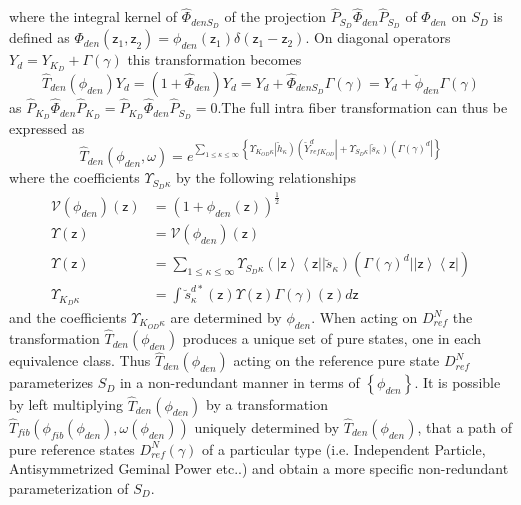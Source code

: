 \documentclass[aps,preprint]{revtex4}%
\begin{document}
where the integral kernel of $\hat{\Phi}_{denS_{D}}$ of the projection
$\hat{P}_{S_{D}}\hat{\Phi}_{den}\hat{P}_{S_{D}}$ of $\hat{\Phi}_{den}$ on
$S_{D}$ is defined as $\Phi_{den}\left(  \mathsf{z}_{1}\mathsf{,z}_{2}\right)
=\phi_{den}\left(  \mathsf{z}_{1}\right)  \delta\left(  \mathsf{z}%
_{1}-\mathsf{z}_{2}\right)  $. On diagonal operators $Y_{d}=Y_{K_{D}}%
+\Gamma\left(  \gamma\right)  $ this transformation becomes
\begin{equation}
\hat{T}_{den}\left(  \phi_{den}\right)  Y_{d}=\left(  1+\hat{\Phi}%
_{den}\right)  Y_{d}=Y_{d}+\hat{\Phi}_{denS_{D}}\Gamma\left(  \gamma\right)
=Y_{d}+\breve{\phi}_{den}\Gamma\left(  \gamma\right)
\end{equation}
as $\hat{P}_{K_{D}}\hat{\Phi}_{den}\hat{P}_{K_{D}}=\hat{P}_{K_{D}}\hat{\Phi
}_{den}\hat{P}_{S_{D}}=0.$The full intra fiber transformation can thus be
expressed as
\begin{equation}
\hat{T}_{den}\left(  \phi_{den},\omega\right)  =e^{\sum_{1\leq\kappa\leq
\infty}\left\{  \Upsilon_{K_{OD}\kappa}\left|  \breve{h}_{\kappa}\right)
\left(  \breve{Y}_{refK_{OD}}^{d}\right|  +\Upsilon_{S_{D}\kappa}\left|
\breve{s}_{\kappa}\right)  \left(  \Gamma\left(  \gamma\right)  ^{d}\right|
\right\}  } \label{refden}%
\end{equation}
where the coefficients $\Upsilon_{S_{D}\kappa}$ by the following relationships%
\begin{align}
\mathcal{V}\left(  \phi_{den}\right)  \left(  \mathsf{z}\right)   &  =\left(
1+\phi_{den}\left(  \mathsf{z}\right)  \right)  ^{\frac{1}{2}}\nonumber\\
\Upsilon\left(  \mathsf{z}\right)   &  =\mathcal{V}\left(  \phi_{den}\right)
\left(  \mathsf{z}\right) \nonumber\\
\Upsilon\left(  \mathsf{z}\right)   &  =\sum_{1\leq\kappa\leq\infty}%
\Upsilon_{S_{D}\kappa}\left(  \left|  \mathsf{z}\right\rangle \left\langle
\mathsf{z}\right|  |\breve{s}_{\kappa}\right)  \left(  \Gamma\left(
\gamma\right)  ^{d}|\left|  \mathsf{z}\right\rangle \left\langle
\mathsf{z}\right|  \right) \nonumber\\
\Upsilon_{K_{D}\kappa}  &  =\int\breve{s}_{\kappa}^{d\ast}\left(
\mathsf{z}\right)  \Upsilon\left(  \mathsf{z}\right)  \Gamma\left(
\gamma\right)  \left(  \mathsf{z}\right)  d\mathsf{z}%
\end{align}
and the coefficients $\Upsilon_{K_{OD}\kappa}$ are determined by $\phi_{den}$.
When acting on $D_{ref}^{N}$ the transformation $\hat{T}_{den}\left(
\phi_{den}\right)  $ produces a unique set of pure states, one in each
equivalence class. Thus $\hat{T}_{den}\left(  \phi_{den}\right)  $ acting on
the reference pure state $D_{ref}^{N}$ parameterizes $S_{D}$ in a
non-redundant manner in terms of $\left\{  \phi_{den}\right\}  $. It is
possible by left multiplying $\hat{T}_{den}\left(  \phi_{den}\right)  $ by a
transformation $\hat{T}_{fib}\left(  \phi_{fib}\left(  \phi_{den}\right)
,\omega\left(  \phi_{den}\right)  \right)  $ uniquely determined by $\hat
{T}_{den}\left(  \phi_{den}\right)  $, that a path of pure reference states
$D_{ref}^{N}\left(  \gamma\right)  $ of a particular type (i.e. Independent
Particle, Antisymmetrized Geminal Power etc..) and obtain a more specific
non-redundant parameterization of $S_{D}$.
\end{document}

